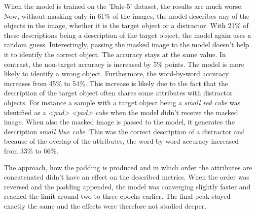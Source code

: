 When the model is trained on the 'Dale-5' dataset, the results are much worse.
Now, without masking only in 61\% of the images, the model describes any of the objects in the image, whether it is the target object or a distractor.
With 21\% of these descriptions being a description of the target object, the model again uses a random guess.
Interestingly, passing the masked image to the model doesn't help it to identify the correct object.
The accuracy stays at the same value.
In contrast, the non-target accuracy is increased by 5\% points.
The model is more likely to identify a wrong object.
Furthermore, the word-by-word accuracy increases from 45\% to 54\%.
This increase is likely due to the fact that the description of the target object often shares some attributes with distractor objects.
For instance a sample with a target object being a \emph{small red cube} was identified as a \emph{<pad> <pad> cube} when the model didn't receive the masked image.
When also the masked image is passed to the model, it generates the description \emph{small blue cube}.
This was the correct description of a distractor and because of the overlap of the attributes, the word-by-word accuracy increased from 33\% to 66\%.

The approach, how the padding is produced and in which order the attributes are concatenated didn't have an effect on the described metrics.
When the order was reversed and the padding appended, the model was converging slightly faster and reached the limit around two to three epochs earlier.
The final peak stayed exactly the same and the effects were therefore not studied deeper.

